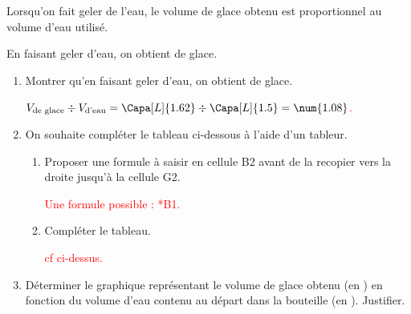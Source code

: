 \begin{corrige}
    Lorsqu’on fait geler de l’eau, le volume de glace obtenu est proportionnel au volume d’eau utilisé.\par 
    En faisant geler  d’eau, on obtient  de glace.\par
    \begin{enumerate}
	    \item Montrer qu’en faisant geler  d’eau, on obtient  de glace.\par
	    \textcolor{red}{$V_\text{de glace}\div V_\text{d'eau}=\Capa[L]{1.62}\div \Capa[L]{1.5} = \num{1.08}$.}
	    \item On souhaite compléter le tableau ci-dessous à l’aide d’un tableur.\par\medskip	    
        \par\medskip        
		\begin{enumerate}
			\item Proposer une formule à saisir en cellule B2 avant de la recopier vers la droite jusqu'à la cellule G2.\par
			\textcolor{red}{Une formule possible : {*B1}.}
			\item Compléter le tableau.\par
			\textcolor{red}{cf ci-dessus.}
		\end{enumerate}
        \setcounter{enumi}{2}
		\item Déterminer le graphique représentant le volume de glace obtenu (en \Capa[L]{}) en fonction du volume d'eau contenu au départ dans la bouteille (en \Capa[L]{}). Justifier.
    \end{enumerate}    
    \Coupe

\end{corrige}
